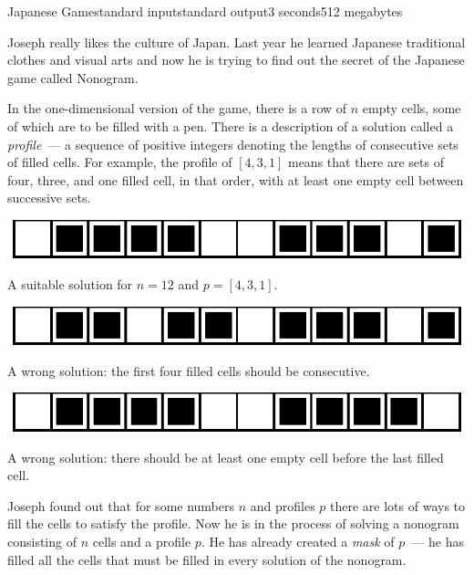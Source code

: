\begin{problem}{Japanese Game}{standard input}{standard output}{3 seconds}{512 megabytes}

Joseph really likes the culture of Japan. Last year he learned Japanese traditional clothes and visual arts and now he is trying to find out the secret of the Japanese game called Nonogram.

In the one-dimensional version of the game, there is a row of $n$ empty cells, some of which are to be filled with a pen. There is a description of a solution called a \emph{profile}~--- a sequence of positive integers denoting the lengths of consecutive sets of filled cells. For example, the profile of $[4, 3, 1]$ means that there are sets of four, three, and one filled cell, in that order, with at least one empty cell between successive sets.

\begin{center}
\includegraphics[scale=1]{001.eps}

A suitable solution for $n = 12$ and $p = [4, 3, 1]$.
\end{center}

\begin{center}
\includegraphics[scale=1]{002.eps}

A wrong solution: the first four filled cells should be consecutive.
\end{center}

\begin{center}
\includegraphics[scale=1]{003.eps}

A wrong solution: there should be at least one empty cell before the last filled cell.
\end{center}

Joseph found out that for some numbers $n$ and profiles $p$ there are lots of ways to fill the cells to satisfy the profile. Now he is in the process of solving a nonogram consisting of $n$ cells and a profile $p$. He has already created a \emph{mask} of $p$~--- he has filled all the cells that must be filled in every solution of the nonogram.


\end{problem}
